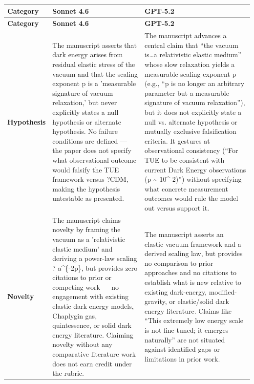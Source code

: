 \documentclass[11pt]{article}
\begin{document}
\begin{longtable}{@{} p{2.2cm} p{6.3cm} p{6.3cm} @{}}
\toprule
\textbf{Category} & \textbf{Sonnet 4.6} & \textbf{GPT-5.2} \\
\midrule
\endfirsthead
\toprule
\textbf{Category} & \textbf{Sonnet 4.6} & \textbf{GPT-5.2} \\
\midrule
\endhead
\bottomrule
\endlastfoot

\rowcolor{rowgray}
\textbf{Hypothesis} &
The manuscript asserts that dark energy arises from residual elastic stress of the vacuum and that the scaling exponent p is a 'measurable signature of vacuum relaxation,' but never explicitly states a null hypothesis or alternate hypothesis. No failure conditions are defined --- the paper does not specify what observational outcome would falsify the TUE framework versus ?CDM, making the hypothesis untestable as presented. &
The manuscript advances a central claim that ``the vacuum is\ldots{}a relativistic elastic medium'' whose slow relaxation yields a measurable scaling exponent p (e.g., ``p is no longer an arbitrary parameter but a measurable signature of vacuum relaxation''), but it does not explicitly state a null vs. alternate hypothesis or mutually exclusive falsification criteria. It gestures at observational consistency (``For TUE to be consistent with current Dark Energy observations (p \textasciitilde{} 10\textasciicircum{}-2)'') without specifying what concrete measurement outcomes would rule the model out versus support it. \\[6pt]

\textbf{Novelty} &
The manuscript claims novelty by framing the vacuum as a 'relativistic elastic medium' and deriving a power-law scaling \textrho{} ? a\textasciicircum{}\{-2p\}, but provides zero citations to prior or competing work --- no engagement with existing elastic dark energy models, Chaplygin gas, quintessence, or solid dark energy literature. Claiming novelty without any comparative literature work does not earn credit under the rubric. &
The manuscript asserts an elastic-vacuum framework and a derived scaling law, but provides no comparison to prior approaches and no citations to establish what is new relative to existing dark-energy, modified-gravity, or elastic/solid dark energy literature. Claims like ``This extremely low energy scale is not fine-tuned; it emerges naturally'' are not situated against identified gaps or limitations in prior work. \\[6pt]


\end{longtable}
\end{document}
